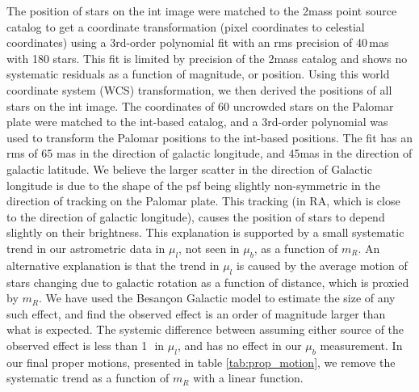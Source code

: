 The position of stars on the \gls{int} image were matched to
the \gls{2mass} point source catalog \citep{2006AJ....131.1163S} to get a coordinate 
transformation (pixel coordinates to celestial coordinates) using a
3rd-order polynomial fit with an \gls{rms} precision of 40\,mas with 180 stars. This fit is limited by precision of the \gls{2mass} catalog and shows no systematic residuals as a function of magnitude, or position.  Using this  world coordinate system (WCS) transformation, we then derived the
positions of all stars on the \gls{int} image. The coordinates of 60 uncrowded
stars on the Palomar plate were matched to the \gls{int}-based catalog, and a 3rd-order polynomial was used to transform the Palomar positions to the \gls{int}-based positions. The fit has an \gls{rms} of 65 mas in the direction of galactic longitude, and 45mas in the direction of galactic latitude.  We believe the larger scatter in the direction of  Galactic longitude is due to the shape of the \gls{psf} being slightly non-symmetric in the direction of tracking on the Palomar plate. This tracking (in RA, which is close to the direction of galactic longitude), causes the position of stars to depend slightly on their brightness. This explanation is supported by  a small systematic trend in our astrometric data in $\mu_l$, not seen in $\mu_b$, as a function of $m_R$.  An alternative explanation is that the  trend in $\mu_l$ is caused by the average motion of stars changing due to galactic rotation as a function of distance, which is proxied by $m_R$.  We have used the Besan\c{c}on Galactic model \citep{2003A&A...409..523R} to estimate the size of any such effect, and find the observed effect is an order of magnitude larger than what is expected. The systemic difference between assuming either source of the observed effect is less than 1\,\masyr\ in $\mu_l$, and has no effect in our $\mu_b$ measurement. In our final proper motions, presented in table \ref{tab:prop_motion}, we remove  the systematic trend as a function of $m_R$ with a linear function.

